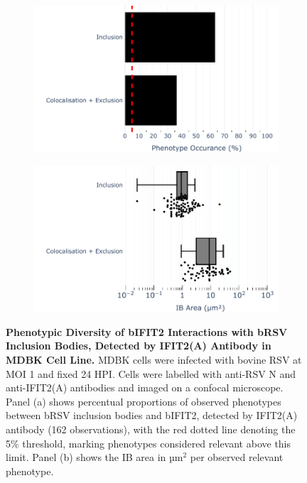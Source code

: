 \begin{figure}
    \begin{subfigure}{0.495\textwidth}
        \caption{}
        \includegraphics[width=1\linewidth]{08. Chapter 3/Figs/02. Infection/02. IFIT2/01. IFIT2A/13. bar_i2a_mdbk.pdf} 
    \end{subfigure}
    \begin{subfigure}{0.495\textwidth}
        \caption{}
        \includegraphics[width=1\linewidth]{08. Chapter 3/Figs/02. Infection/02. IFIT2/01. IFIT2A/14. box_i2a_mdbk.pdf}
    \end{subfigure}
    \caption[Phenotypic Diversity of bIFIT2 Interactions with bRSV Inclusion Bodies, Detected by IFIT2(A) Antibody in MDBK Cell Line.]{\textbf{Phenotypic Diversity of bIFIT2 Interactions with bRSV Inclusion Bodies, Detected by IFIT2(A) Antibody in MDBK Cell Line.} MDBK cells were infected with bovine RSV at MOI 1 and fixed 24 HPI. Cells were labelled with anti-RSV N and anti-IFIT2(A) antibodies and imaged on a confocal microscope. Panel (a) shows percentual proportions of observed phenotypes between bRSV inclusion bodies and bIFIT2, detected by IFIT2(A) antibody (162 observations), with the red dotted line denoting the 5\% threshold, marking phenotypes considered relevant above this limit. Panel (b) shows the IB area in \(\mbox{µm}^2\) per observed relevant phenotype.}
    \label{fig:Phenotypic Diversity of bIFIT2 Interactions with bRSV Inclusion Bodies, Detected by IFIT2(A) Antibody in MDBK Cell Line}
\end{figure}

